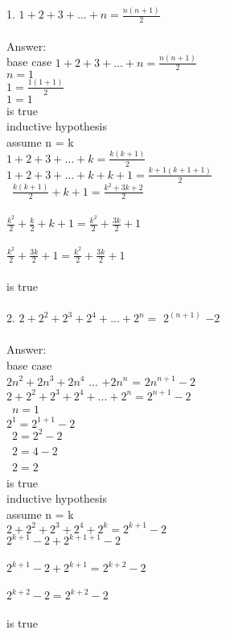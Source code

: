 \documentclass[11pt]{article}
\begin{document}
1. $ 1 + 2 + 3 + ... + n = \frac{n(n+1)}{2}$\\\\
		Answer:\\
base case
$1+2+3+...+n = \frac{n(n+1)}{2}$\\
$n=1$\\
$1 = \frac{1(1+1)}{2}$\\
$1 = 1$\\
is true\\
inductive hypothesis \\
assume n = k\\
$1+2+3+...+k = \frac{k(k+1)}{2}$\\
$1+2+3+...+ k + k+1 = \frac{k+1( k+1+1)}{2}$\\\
$ \frac{k(k+1)}{2} + k+1 = \frac{k^2+3k+2}{2}  $\\\\
$ \frac{k^{2}  }{2} + \frac{k}{2} + k +1 = \frac{k^{2}}{2} + \frac{3k}{2} +1 $\\\\
$ \frac{k^{2}}{2} + \frac{3k}{2} +1  = \frac{k^{2}}{2} + \frac{3k}{2} + 1 $\\\\
is true\\\\



2. $ 2 + 2^2 + 2^3 + 2^4 + ... + 2^n = $
	$2^(n+1)$
	$ - 2$\\\\
Answer:\\
base case\\
$ 2n^{2} + 2n^{3} + 2n^{4}  $ ... $ + 2n^{n}$ = $ 2n^{n+1} -2  $\\
$2+2^{2}+2^{3}+2^{4}+ ... + 2^{n} = 2^{n+1} -2$\\\
$n=1$\\
$2^{1} = 2^{1+1} -2$\\\
$ 2 = 2^{2} -2$\\\
$ 2 = 4-2 $\\\
$2 =2 $\\
is true\\
inductive hypothesis\\ 
assume n = k \\
$ 2+2^{2}+2^{3}+2^{4}+2^{k} = 2^{k+1} -2 $\\
$ 2^{k+1} -2 + 2^{k+1 +1} -2$\\\\
$ 2^{k+1} -2 +2^{k+1} = 2^{k+2}-2$\\\\
$ 2^{k+2} -2 = 2^{k+2} -2 $\\\\
is true
\end{document}
